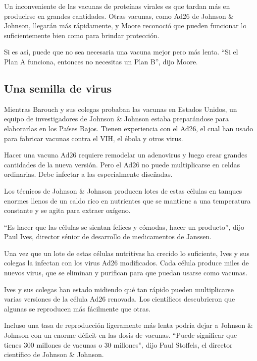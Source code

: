Un inconveniente de las vacunas de proteínas virales es que tardan más
en producirse en grandes cantidades. Otras vacunas, como Ad26 de Johnson
\& Johnson, llegarán más rápidamente, y Moore reconoció que pueden
funcionar lo suficientemente bien como para brindar protección.

Si es así, puede que no sea necesaria una vacuna mejor pero más lenta.
``Si el Plan A funciona, entonces no necesitas un Plan B'', dijo Moore.

\hypertarget{una-semilla-de-virus}{%
\subsection{Una semilla de virus}\label{una-semilla-de-virus}}

Mientras Barouch y sus colegas probaban las vacunas en Estados Unidos,
un equipo de investigadores de Johnson \& Johnson estaba preparándose
para elaborarlas en los Países Bajos. Tienen experiencia con el Ad26, el
cual han usado para fabricar vacunas contra el VIH, el ébola y otros
virus.

Hacer una vacuna Ad26 requiere remodelar un adenovirus y luego crear
grandes cantidades de la nueva versión. Pero el Ad26 no puede
multiplicarse en celdas ordinarias. Debe infectar a las especialmente
diseñadas.

Los técnicos de Johnson \& Johnson producen lotes de estas células en
tanques enormes llenos de un caldo rico en nutrientes que se mantiene a
una temperatura constante y se agita para extraer oxígeno.

``Es hacer que las células se sientan felices y cómodas, hacer un
producto'', dijo Paul Ives, director sénior de desarrollo de
medicamentos de Janssen.

Una vez que un lote de estas células nutritivas ha crecido lo
suficiente, Ives y sus colegas la infectan con los virus Ad26
modificados. Cada célula produce miles de nuevos virus, que se eliminan
y purifican para que puedan usarse como vacunas.

Ives y sus colegas han estado midiendo qué tan rápido pueden
multiplicarse varias versiones de la célula Ad26 renovada. Los
científicos descubrieron que algunas se reproducen más fácilmente que
otras.

Incluso una tasa de reproducción ligeramente más lenta podría dejar a
Johnson \& Johnson con un enorme déficit en las dosis de vacunas.
``Puede significar que tienes 300 millones de vacunas o 30 millones'',
dijo Paul Stoffels, el director científico de Johnson \& Johnson.

